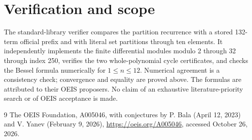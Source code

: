 \documentclass[10pt]{article}
\begin{document}
\section{Verification and scope}
The standard-library verifier compares the partition recurrence with a stored
132-term official prefix and with literal set partitions through ten elements.
It independently implements the finite differential modules modulo 2 through
32 through index 250, verifies the two whole-polynomial cycle certificates,
and checks the Bessel formula numerically for $1\le n\le12$.
Numerical agreement is a consistency check; convergence and equality are proved
above. The formulas are attributed to their OEIS proposers. No claim of an
exhaustive literature-priority search or of OEIS acceptance is made.
\begin{thebibliography}{9}
 The OEIS Foundation, A005046, with conjectures by
P. Bala (April 12, 2023) and V. Yanev (February 9, 2026),
\url{https://oeis.org/A005046}, accessed October 26, 2026.
\end{thebibliography}
\end{document}
